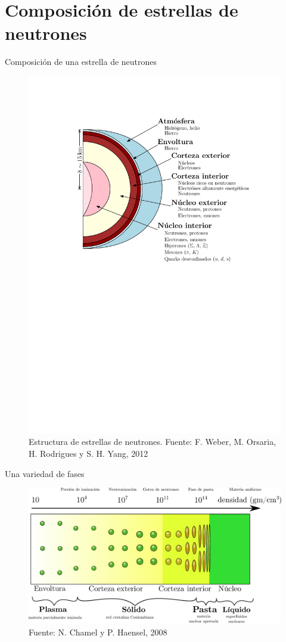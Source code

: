 \documentclass[11pt]{beamer}
\begin{document}
\section{Composición de estrellas de neutrones}
\begin{frame}{Composición de una estrella de neutrones}
    \begin{figure}
        \centering
        \includegraphics[width=0.75\linewidth]{neutronstar.pdf}
        \caption{\centering Estructura de estrellas de neutrones. Fuente: F. Weber, M. Orsaria, H. Rodrigues y S. H. Yang, 2012}
    \end{figure}
    
\end{frame}

\begin{frame}{Una variedad de fases}
    \vspace{0.3cm}
    \begin{figure}
        \centering
        \includegraphics[width=\linewidth]{Density.pdf}
        \caption{Fuente: N. Chamel y P. Haensel, 2008}
    \end{figure}
\end{frame}
\end{document}

